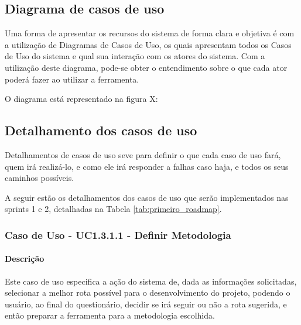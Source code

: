 \subsection{Diagrama de casos de uso}

Uma forma de apresentar os recursos do sistema de forma clara e objetiva é com a utilização de Diagramas de Casos de Uso, os quais apresentam todos os Casos de Uso do sistema e qual sua interação com os atores do sistema. Com a utilização deste diagrama, pode-se obter o entendimento sobre o que cada ator poderá fazer ao utilizar a ferramenta.

O diagrama está representado na figura X:

\subsection{Detalhamento dos casos de uso}

Detalhamentos de casos de uso seve para definir o que cada caso de uso fará, quem irá realizá-lo, e como ele irá responder a falhas caso haja, e todos os seus caminhos possíveis.

A seguir estão os detalhamentos dos casos de uso que serão implementados nas sprints 1 e 2, detalhadas na Tabela \ref{tab:primeiro_roadmap}.

\subsubsection{Caso de Uso - UC1.3.1.1 - Definir Metodologia}

\paragraph{Descrição}

Este caso de uso especifica a ação do sistema de, dada as informações solicitadas, selecionar a melhor rota possível para o desenvolvimento do projeto, podendo o usuário, ao final do questionário, decidir se irá seguir ou não a rota sugerida, e então preparar a ferramenta para a metodologia escolhida.

